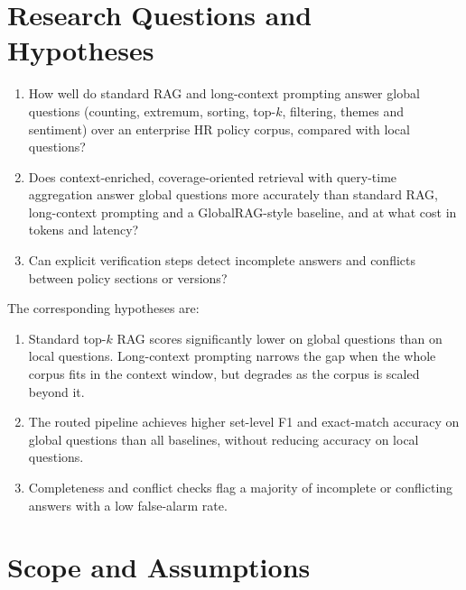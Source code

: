 \documentclass[11pt,letterpaper,oneside]{report}
\begin{document}
\section{Research Questions and Hypotheses}
\label{sec:rq}

\begin{enumerate}[label=\textbf{RQ\arabic*.}]
  \item How well do standard RAG and long-context prompting answer global
  questions (counting, extremum, sorting, top-$k$, filtering, themes and
  sentiment) over an enterprise HR policy corpus, compared with local
  questions?
  \item Does context-enriched, coverage-oriented retrieval with query-time
  aggregation answer global questions more accurately than standard RAG,
  long-context prompting and a GlobalRAG-style baseline, and at what cost in
  tokens and latency?
  \item Can explicit verification steps detect incomplete answers and
  conflicts between policy sections or versions?
\end{enumerate}

\noindent The corresponding hypotheses are:
\begin{enumerate}[label=\textbf{H\arabic*.}]
  \item Standard top-$k$ RAG scores significantly lower on global questions
  than on local questions. Long-context prompting narrows the gap when the
  whole corpus fits in the context window, but degrades as the corpus is
  scaled beyond it.
  \item The routed pipeline achieves higher set-level F1 and exact-match accuracy on global questions than all
baselines, without reducing accuracy on local questions.
  \item Completeness and conflict checks flag a majority of incomplete or
  conflicting answers with a low false-alarm rate.
\end{enumerate}

\section{Scope and Assumptions}
\label{sec:scope}
\end{document}
